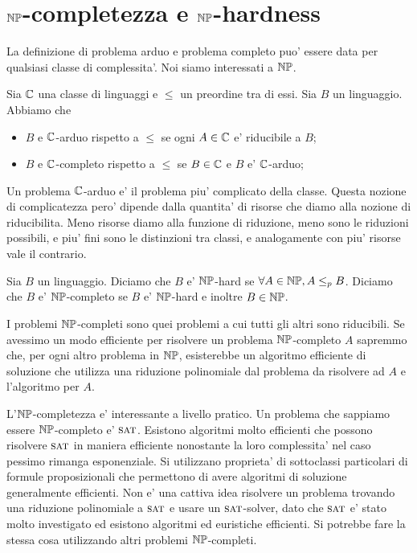 \section{$\mathbb{NP}$-completezza e $\mathbb{NP}$-hardness}

La definizione di problema arduo e problema completo puo' essere data per qualsiasi classe di
complessita'. Noi siamo interessati a $\mathbb{NP}$.

\begin{defn}
    Sia $\mathbb{C}$ una classe di linguaggi e $\leq$ un preordine tra di essi. Sia $B$ un linguaggio.
    Abbiamo che
    \begin{itemize}
        \item $B$ e $\mathbb{C}$-arduo rispetto a $\leq$ se ogni $A \in \mathbb{C}$ e' riducibile a $B$;
        \item $B$ e $\mathbb{C}$-completo rispetto a $\leq$ se $B \in \mathbb{C}$ e $B$ e' $\mathbb{C}$-arduo;
    \end{itemize}
\end{defn}

Un problema $\mathbb{C}$-arduo e' il problema piu' complicato della classe. Questa nozione di
complicatezza pero' dipende dalla quantita' di risorse che diamo alla nozione di riducibilita.  Meno
risorse diamo alla funzione di riduzione, meno sono le riduzioni possibili, e piu' fini sono le
distinzioni tra classi, e analogamente con piu' risorse vale il contrario.

\begin{defn}
    Sia $B$ un linguaggio. Diciamo che $B$ e' $\mathbb{NP}$-hard se $\forall A \in \mathbb{NP}, A \leq_{p}
    B$. Diciamo che $B$ e' $\mathbb{NP}$-completo se $B$ e' $\mathbb{NP}$-hard e inoltre $B \in \mathbb{NP}$.
\end{defn}

I problemi $\mathbb{NP}$-completi sono quei problemi a cui tutti gli altri sono riducibili. Se avessimo
un modo efficiente per risolvere un problema $\mathbb{NP}$-completo $A$ sapremmo che, per ogni altro
problema in $\mathbb{NP}$, esisterebbe un algoritmo efficiente di soluzione che utilizza una riduzione
polinomiale dal problema da risolvere ad $A$ e l'algoritmo per $A$.

L'$\mathbb{NP}$-completezza e' interessante a livello pratico. Un problema che sappiamo essere
$\mathbb{NP}$-completo e' $\textsc{sat}$. Esistono algoritmi molto efficienti che possono risolvere $\textsc{sat}$ in
maniera efficiente nonostante la loro complessita' nel caso pessimo rimanga esponenziale. Si
utilizzano proprieta' di sottoclassi particolari di formule proposizionali che permettono di avere
algoritmi di soluzione generalmente efficienti. Non e' una cattiva idea risolvere un problema
trovando una riduzione polinomiale a $\textsc{sat}$ e usare un $\textsc{sat}$-solver, dato che $\textsc{sat}$ e' stato molto
investigato ed esistono algoritmi ed euristiche efficienti. Si potrebbe fare la stessa cosa
utilizzando altri problemi $\mathbb{NP}$-completi.


